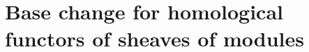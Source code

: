 \section{Base change for homological functors of sheaves of modules}
\label{section-base-change-for-homological-functors-of-sheaves-of-modules}

